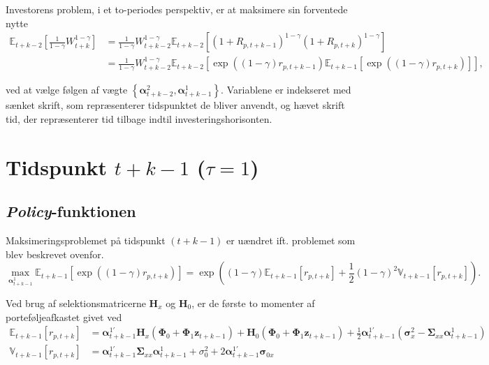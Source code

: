 \documentclass[
  a4paper,
  oneside]{memoir}
\begin{document}
Investorens problem, i et to-periodes perspektiv, er at maksimere sin forventede nytte
\begin{align*}
\mathbb{E}_{t+k-2}\left[\frac{1}{1-\gamma} W_{t+k}^{1-\gamma}\right]&=\frac{1}{1-\gamma} W_{t+k-2}^{1-\gamma} \mathbb{E}_{t+k-2}\left[(1+R_{p,t+k-1})^{1-\gamma}(1+R_{p,t+k})^{1-\gamma}\right]\\
&=\frac{1}{1-\gamma} W_{t+k-2}^{1-\gamma} \mathbb{E}_{t+k-2}\left[\exp((1-\gamma) r_{p,t+k-1}) \mathbb{E}_{t+k-1}\left[\exp((1-\gamma)r_{p,t+k})\right]\right],
\end{align*}

ved at vælge følgen af vægte \(\left\{\bm{\alpha}_{t+k-2}^2, \bm{\alpha}_{t+k-1}^1\right\}\). Variablene er indekseret med sænket skrift, som repræsenterer tidspunktet de bliver anvendt, og hævet skrift tid, der repræsenterer tid tilbage indtil investeringshorisonten.

\hypertarget{tidspunkt-tk-1-tau1}{%
\section{\texorpdfstring{Tidspunkt \(t+k-1\) (\(\tau=1\))}{Tidspunkt t+k-1 (\textbackslash tau=1)}}\label{tidspunkt-tk-1-tau1}}

\hypertarget{policy-funktionen}{%
\subsection{\texorpdfstring{\emph{Policy}-funktionen}{Policy-funktionen}}\label{policy-funktionen}}

Maksimeringsproblemet på tidspunkt \((t+k-1)\) er uændret ift. problemet som blev beskrevet ovenfor.
\begin{equation}
\max_{\bm{\alpha}_{t+k-1}^1} \mathbb{E}_{t+k-1}\left[\exp((1-\gamma)r_{p,t+k})\right] = \exp\left((1-\gamma) \mathbb{E}_{t+k-1}\left[r_{p,t+k}\right]+\frac{1}{2}(1-\gamma)^2 \mathbb{V}_{t+k-1}\left[r_{p,t+k}\right]\right).\label{eq:polmaks}
\end{equation}

Ved brug af selektionsmatricerne \(\bm{H}_x\) og \(\bm{H}_0\), er de første to momenter af porteføljeafkastet givet ved
\begin{align*}
\mathbb{E}_{t+k-1}\left[r_{p,t+k}\right]&= \bm{\alpha}_{t+k-1}^{1\prime} \bm{H}_x (\bm{\Phi}_0 +\bm{\Phi}_1\bm{z}_{t+k-1}) + \bm{H}_0(\bm{\Phi}_0 +\bm{\Phi}_1\bm{z}_{t+k-1})+\frac{1}{2} \bm{\alpha}_{t+k-1}^{1\prime} \left(\bm{\sigma}_x^2-\bm{\Sigma}_{xx}\bm{\alpha}_{t+k-1}^{1}\right)\\
\mathbb{V}_{t+k-1}[r_{p,t+k}]&=\bm{\alpha}_{t+k-1}^{1\prime}\bm{\Sigma}_{xx}\bm{\alpha}_{t+k-1}^{1}+ \sigma_0^2 + 2\bm{\alpha}_{t+k-1}^{1\prime}\bm{\sigma}_{0x}
\end{align*}
\end{document}
